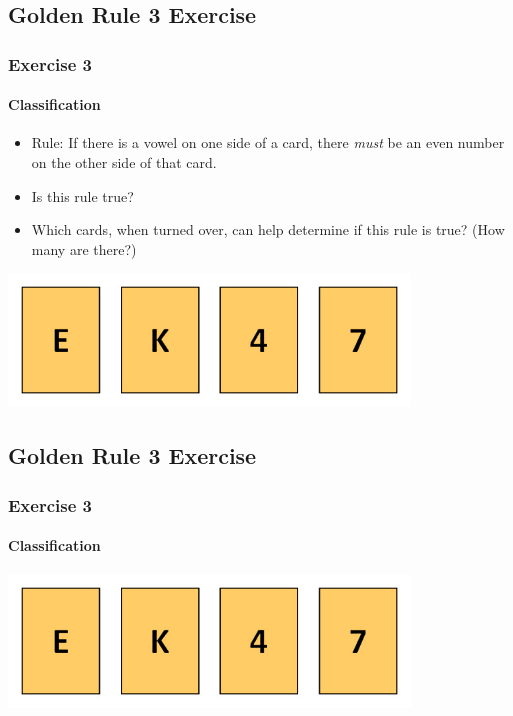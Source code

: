 %

\subsection{Golden Rule 3 Exercise}
\begin{frame}
  \frametitle{Exercise 3}
  \framesubtitle{Classification}
  \begin{itemize}
    \item Rule: If there is a vowel on one side of a card, there \textit{must} be an even number on the other side of that card.
    \item Is this rule true?
    \item Which cards, when turned over, can help determine if this rule is true? (How many are there?)
  \end{itemize}
  \includegraphics[width=0.8\textwidth]{images/wason}
\end{frame}

\subsection{Golden Rule 3 Exercise}
\begin{frame}
  \frametitle{Exercise 3}
  \framesubtitle{Classification}
  \includegraphics[width=0.8\textwidth]{images/wason}
\end{frame}

